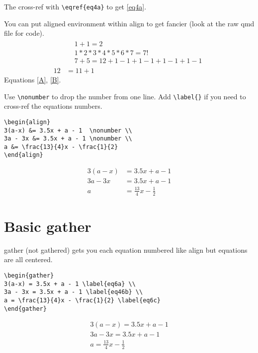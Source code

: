 \documentclass[
  letterpaper,
  DIV=11,
  numbers=noendperiod]{scrreprt}
\begin{document}
The cross-ref with \texttt{\textbackslash{}eqref\{eq4a\}} to get
\eqref{eq4a}.

You can put aligned environment within align to get fancier (look at the
raw qmd file for code). \begin{align}
  & {\begin{aligned}
   & 1 + 1 = 2\\
   & 1 * 2 * 3 * 4 * 5 * 6 * 7 = 7!\\
   & 7 + 5 = 12+1-1+1-1+1-1+1-1
  \end{aligned}} \label{A} \\
     12 &= 11 + 1 \label{B}
\end{align} Equations \eqref{A}, \eqref{B}.

Use \texttt{\textbackslash{}nonumber} to drop the number from one line.
Add \texttt{\textbackslash{}label\{\}} if you need to cross-ref the
equations numbers.

\begin{verbatim}
\begin{align}  
3(a-x) &= 3.5x + a - 1  \nonumber \\
3a - 3x &= 3.5x + a - 1 \nonumber \\
a &= \frac{13}{4}x - \frac{1}{2} 
\end{align}
\end{verbatim}

\begin{align}  
3(a-x) &= 3.5x + a - 1  \\
3a - 3x &= 3.5x + a - 1 \nonumber \\
a &= \frac{13}{4}x - \frac{1}{2} 
\end{align}

\section{Basic gather}\label{basic-gather}

gather (not gathered) gets you each equation numbered like align but
equations are all centered.

\begin{verbatim}
\begin{gather}  
3(a-x) = 3.5x + a - 1 \label{eq6a} \\
3a - 3x = 3.5x + a - 1 \label{eq46b} \\
a = \frac{13}{4}x - \frac{1}{2} \label{eq6c}
\end{gather}
\end{verbatim}

\begin{gather}  
3(a-x) = 3.5x + a - 1 \label{eq6a} \\
3a - 3x = 3.5x + a - 1 \label{eq46b} \\
a = \frac{13}{4}x - \frac{1}{2} \label{eq6c}
\end{gather}
\end{document}
